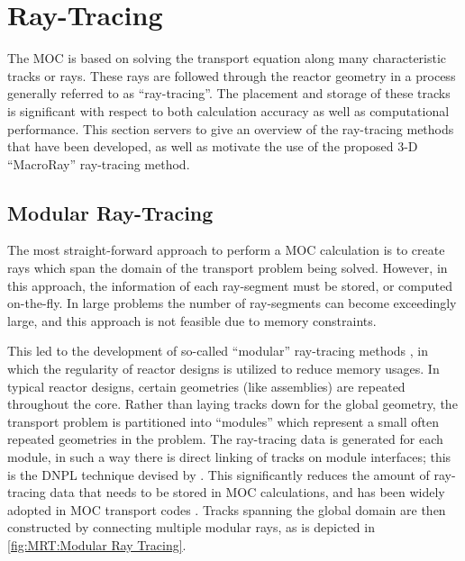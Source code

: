 \chapter{Ray-Tracing}{\label{ch:Ray-Tracing}
    
    
    
    \def\figpath{chapters/04/figures/}
    \graphicspath{ {\figpath} }

    The \acf{MOC} \cite{Askew1972} is based on solving the transport equation along many characteristic tracks or rays.
    These rays are followed through the reactor geometry in a process generally referred to as ``ray-tracing''.
    The placement and storage of these tracks is significant with respect to both calculation accuracy as well as computational performance.
    This section servers to give an overview of the ray-tracing methods that have been developed, as well as motivate the use of the proposed 3-D ``MacroRay'' ray-tracing method.

    \section{Modular Ray-Tracing}{\label{sec:RT:Modular Ray-Tracing}
        The most straight-forward approach to perform a \ac{MOC} calculation is to create rays which span the domain of the transport problem being solved.
        However, in this approach, the information of each ray-segment must be stored, or computed on-the-fly.
        In large problems the number of ray-segments can become exceedingly large, and this approach is not feasible due to memory constraints.

        This led to the development of so-called ``modular'' ray-tracing methods \cite{Filippone1980,Saji2000,Wu2003,Kochunas2013}, in which the regularity of reactor designs is utilized to reduce memory usages.
        In typical reactor designs, certain geometries (like assemblies) are repeated throughout the core.
        Rather than laying tracks down for the global geometry, the transport problem is partitioned into ``modules'' which represent a small often repeated geometries in the problem.
        The ray-tracing data is generated for each module, in such a way there is direct linking of tracks on module interfaces; this is the \ac{DNPL} technique devised by \citet{Saji2000}.
        This significantly reduces the amount of ray-tracing data that needs to be stored in \ac{MOC} calculations, and has been widely adopted in \ac{MOC} transport codes \cite{Hong1998,Jung2009,Tang2009,DeCART,APOLLO3,MPACT2016,Hebert2017a}.
        Tracks spanning the global domain are then constructed by connecting multiple modular rays, as is depicted in \cref{fig:MRT:Modular Ray Tracing}.

}}

